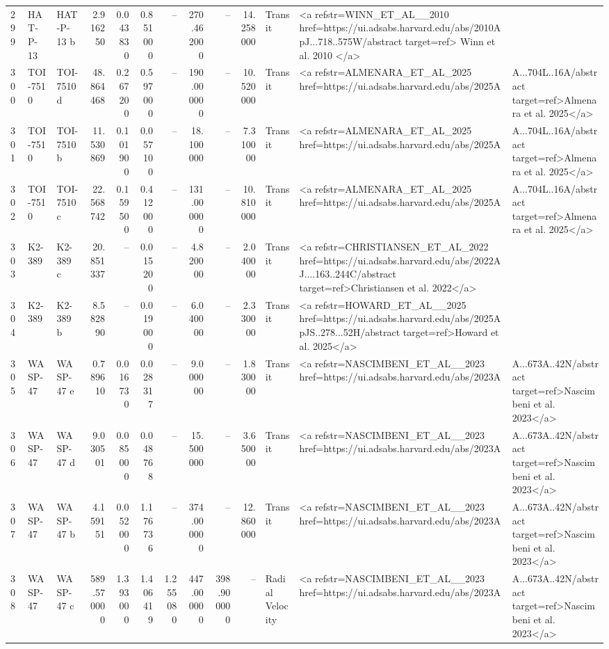 \begin{tabular}{lllrrrrrrrll}
299 & HAT-P-13 & HAT-P-13 b & 2.916250 & 0.043830 & 0.851000 & -- & 270.462000 & -- & 14.258000 & Transit & <a refstr=WINN_ET_AL__2010 href=https://ui.adsabs.harvard.edu/abs/2010ApJ...718..575W/abstract target=ref> Winn et al. 2010 </a> \\
300 & TOI-7510 & TOI-7510 d & 48.864468 & 0.267200 & 0.597000 & -- & 190.000000 & -- & 10.520000 & Transit & <a refstr=ALMENARA_ET_AL_2025 href=https://ui.adsabs.harvard.edu/abs/2025A&A...704L..16A/abstract target=ref>Almenara et al. 2025</a> \\
301 & TOI-7510 & TOI-7510 b & 11.530869 & 0.101900 & 0.057100 & -- & 18.100000 & -- & 7.310000 & Transit & <a refstr=ALMENARA_ET_AL_2025 href=https://ui.adsabs.harvard.edu/abs/2025A&A...704L..16A/abstract target=ref>Almenara et al. 2025</a> \\
302 & TOI-7510 & TOI-7510 c & 22.568742 & 0.159500 & 0.412000 & -- & 131.000000 & -- & 10.810000 & Transit & <a refstr=ALMENARA_ET_AL_2025 href=https://ui.adsabs.harvard.edu/abs/2025A&A...704L..16A/abstract target=ref>Almenara et al. 2025</a> \\
303 & K2-389 & K2-389 c & 20.851337 & -- & 0.015200 & -- & 4.820000 & -- & 2.040000 & Transit & <a refstr=CHRISTIANSEN_ET_AL_2022 href=https://ui.adsabs.harvard.edu/abs/2022AJ....163..244C/abstract target=ref>Christiansen et al. 2022</a> \\
304 & K2-389 & K2-389 b & 8.582890 & -- & 0.019000 & -- & 6.040000 & -- & 2.330000 & Transit & <a refstr=HOWARD_ET_AL__2025 href=https://ui.adsabs.harvard.edu/abs/2025ApJS..278...52H/abstract target=ref>Howard et al. 2025</a> \\
305 & WASP-47 & WASP-47 e & 0.789610 & 0.016730 & 0.028317 & -- & 9.000000 & -- & 1.830000 & Transit & <a refstr=NASCIMBENI_ET_AL__2023 href=https://ui.adsabs.harvard.edu/abs/2023A&A...673A..42N/abstract target=ref>Nascimbeni et al. 2023</a> \\
306 & WASP-47 & WASP-47 d & 9.030501 & 0.085000 & 0.048768 & -- & 15.500000 & -- & 3.650000 & Transit & <a refstr=NASCIMBENI_ET_AL__2023 href=https://ui.adsabs.harvard.edu/abs/2023A&A...673A..42N/abstract target=ref>Nascimbeni et al. 2023</a> \\
307 & WASP-47 & WASP-47 b & 4.159151 & 0.052000 & 1.176736 & -- & 374.000000 & -- & 12.860000 & Transit & <a refstr=NASCIMBENI_ET_AL__2023 href=https://ui.adsabs.harvard.edu/abs/2023A&A...673A..42N/abstract target=ref>Nascimbeni et al. 2023</a> \\
308 & WASP-47 & WASP-47 c & 589.570000 & 1.393000 & 1.406419 & 1.255080 & 447.000000 & 398.900000 & -- & Radial Velocity & <a refstr=NASCIMBENI_ET_AL__2023 href=https://ui.adsabs.harvard.edu/abs/2023A&A...673A..42N/abstract target=ref>Nascimbeni et al. 2023</a> \\

\end{tabular}
